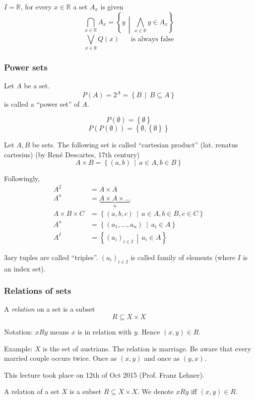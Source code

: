 \documentclass[a4paper,landscape,twocolumn]{article}
\newcommand\meta[3]{This #1 took place on #2 (#3).\par}
\newcommand\set[1]{\left\{#1\right\}}
\newcommand\setdef[2]{\left\{#1\,\middle|\,#2\right\}}
\newcommand\mathspace{\hspace{20pt}}
\begin{document}
$I = \mathbb{R}$, for every $x \in \mathbb{R}$ a set $A_x$ is given
\[ \bigcap_{x \in \mathbb{R}} A_x = \setdef{y}{\bigwedge_{x \in \mathbb{R}} y \in A_x} \]
\[ \bigvee_{x \in \emptyset} Q(x) \mathspace\text{is always false} \]

\subsubsection{Power sets}

Let $A$ be a set.
\[ P(A) = 2^A = \setdef{B}{B \subseteq A} \]
is called a \enquote{power set} of $A$.

\[ P(\emptyset) = \set{\emptyset} \]
\[ P(P(\emptyset)) = \set{\emptyset, \set{\emptyset}} \]

Let $A, B$ be sets.
The following set is called \enquote{cartesian product} (lat. renatus cartesius) (by René Descartes, 17th century)
\[ A \times B = \setdef{(a, b)}{a \in A, b \in B} \]

Followingly,
\begin{align*}
  A^2 &= A \times A \\
  A^n &= \underbrace{A \times A \times \ldots}_{n} \\
  A \times B \times C &= \setdef{(a, b, c)}{a \in A, b \in B, c \in C} \\
  A^n &= \setdef{(a_1, \ldots, a_n)}{a_i \in A} \\
  A^I &= \setdef{(a_i)_{i \in I}}{a_i \in A}
\end{align*}

3ary tuples are called \enquote{triples}.
$(a_i)_{i \in I}$ is called family of elements (where $I$ is an index set).

\subsubsection{Relations of sets}

A \emph{relation} on a set is a subset
\[ R \subseteq X \times X \]

Notation: $x R y$ means $x$ is in relation with $y$. Hence $(x, y) \in R$.

Example: $X$ is the set of austrians. The relation is marriage.
  Be aware that every married couple occurs twice. Once as $(x, y)$ and once as $(y, x)$.

\meta{lecture}{12th of Oct 2015}{Prof. Franz Lehner}

A relation of a set $X$ is a subset $R \subseteq X \times X$. We denote $x R y$ iff $(x,y) \in R$.
\end{document}
